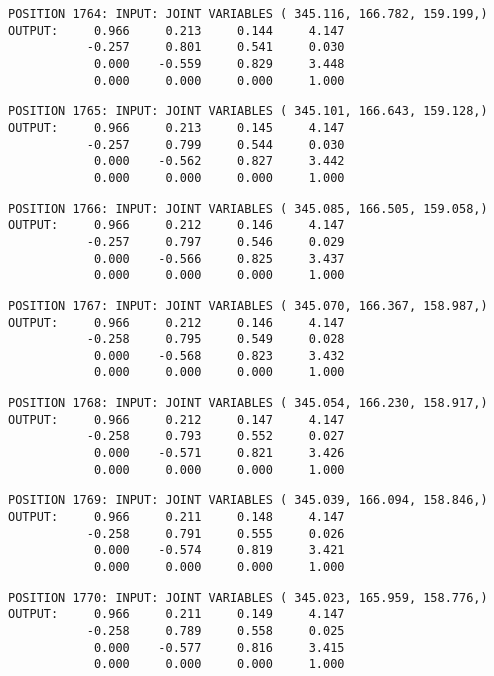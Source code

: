 \begin{verbatim}
POSITION 1764: INPUT: JOINT VARIABLES ( 345.116, 166.782, 159.199,)
OUTPUT:     0.966     0.213     0.144     4.147
           -0.257     0.801     0.541     0.030
            0.000    -0.559     0.829     3.448
            0.000     0.000     0.000     1.000
\end{verbatim} \pagebreak[1]\begin{verbatim}
POSITION 1765: INPUT: JOINT VARIABLES ( 345.101, 166.643, 159.128,)
OUTPUT:     0.966     0.213     0.145     4.147
           -0.257     0.799     0.544     0.030
            0.000    -0.562     0.827     3.442
            0.000     0.000     0.000     1.000
\end{verbatim} \pagebreak[1]\begin{verbatim}
POSITION 1766: INPUT: JOINT VARIABLES ( 345.085, 166.505, 159.058,)
OUTPUT:     0.966     0.212     0.146     4.147
           -0.257     0.797     0.546     0.029
            0.000    -0.566     0.825     3.437
            0.000     0.000     0.000     1.000
\end{verbatim} \pagebreak[1]\begin{verbatim}
POSITION 1767: INPUT: JOINT VARIABLES ( 345.070, 166.367, 158.987,)
OUTPUT:     0.966     0.212     0.146     4.147
           -0.258     0.795     0.549     0.028
            0.000    -0.568     0.823     3.432
            0.000     0.000     0.000     1.000
\end{verbatim} \pagebreak[1]\begin{verbatim}
POSITION 1768: INPUT: JOINT VARIABLES ( 345.054, 166.230, 158.917,)
OUTPUT:     0.966     0.212     0.147     4.147
           -0.258     0.793     0.552     0.027
            0.000    -0.571     0.821     3.426
            0.000     0.000     0.000     1.000
\end{verbatim} \pagebreak[1]\begin{verbatim}
POSITION 1769: INPUT: JOINT VARIABLES ( 345.039, 166.094, 158.846,)
OUTPUT:     0.966     0.211     0.148     4.147
           -0.258     0.791     0.555     0.026
            0.000    -0.574     0.819     3.421
            0.000     0.000     0.000     1.000
\end{verbatim} \pagebreak[1]\begin{verbatim}
POSITION 1770: INPUT: JOINT VARIABLES ( 345.023, 165.959, 158.776,)
OUTPUT:     0.966     0.211     0.149     4.147
           -0.258     0.789     0.558     0.025
            0.000    -0.577     0.816     3.415
            0.000     0.000     0.000     1.000
\end{verbatim} \pagebreak[1]\begin{verbatim}

\end{verbatim}
